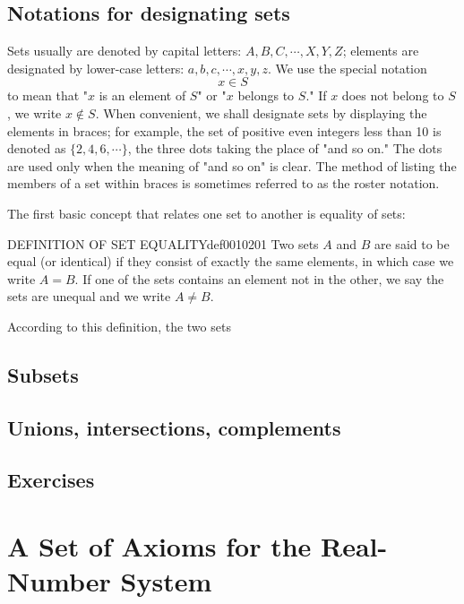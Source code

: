\documentclass[cn,11pt,chinese]{elegantbook}
\numberwithin{equation}{section}
\begin{document}
\subsection{Notations for designating sets}
Sets usually are denoted by capital letters: $A,B,C,\cdots,X,Y,Z$; elements are designated by lower-case letters: $a,b,c,\cdots,x,y,z$. We use the special notation
\[
x \in S
\]
to mean that "$x$ is an element of $S$" or "$x$ belongs to $S$." If $x$ does not belong to $S$, we write $x \notin S$. When convenient, we shall designate sets by displaying the elements in braces; for example, the set of positive even integers less than 10 is denoted as $\{2, 4, 6, \cdots\}$, the three dots taking the place of "and so on." The dots are used only when the meaning of "and so on" is clear. The method of listing the members of a set within braces is sometimes referred to as the roster notation.

The first basic concept that relates one set to another is equality of sets: 
\begin{definition}{DEFINITION OF SET EQUALITY}{def0010201}
Two sets $A$ and $B$ are said to be equal (or identical) if they consist of exactly the same elements, in which case we write $A = B$. If one of the sets contains an element not in the other, we say the sets are unequal and we write $A \neq B$.
\end{definition}

\begin{example}
According to this definition, the two sets
\end{example}

\subsection{Subsets}


\subsection{Unions, intersections, complements}



\subsection{Exercises}


\section{A Set of Axioms for the Real-Number System}\label{section00103}
\end{document}
